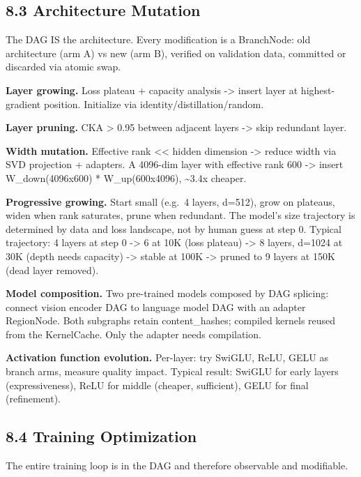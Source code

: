\subsection{8.3 Architecture Mutation}\label{architecture-mutation}

The DAG IS the architecture. Every modification is a BranchNode: old architecture (arm A) vs new (arm B), verified on validation data, committed or discarded via atomic swap.

\textbf{Layer growing.} Loss plateau + capacity analysis -\textgreater{} insert layer at highest-gradient position. Initialize via identity/distillation/random.

\textbf{Layer pruning.} CKA \textgreater{} 0.95 between adjacent layers -\textgreater{} skip redundant layer.

\textbf{Width mutation.} Effective rank \textless\textless{} hidden dimension -\textgreater{} reduce width via SVD projection + adapters. A 4096-dim layer with effective rank 600 -\textgreater{} insert W\_down(4096x600) * W\_up(600x4096), \textasciitilde3.4x cheaper.

\textbf{Progressive growing.} Start small (e.g.~4 layers, d=512), grow on plateaus, widen when rank saturates, prune when redundant. The model's size trajectory is determined by data and loss landscape, not by human guess at step 0. Typical trajectory: 4 layers at step 0 -\textgreater{} 6 at 10K (loss plateau) -\textgreater{} 8 layers, d=1024 at 30K (depth needs capacity) -\textgreater{} stable at 100K -\textgreater{} pruned to 9 layers at 150K (dead layer removed).

\textbf{Model composition.} Two pre-trained models composed by DAG splicing: connect vision encoder DAG to language model DAG with an adapter RegionNode. Both subgraphs retain content\_hashes; compiled kernels reused from the KernelCache. Only the adapter needs compilation.

\textbf{Activation function evolution.} Per-layer: try SwiGLU, ReLU, GELU as branch arms, measure quality impact. Typical result: SwiGLU for early layers (expressiveness), ReLU for middle (cheaper, sufficient), GELU for final (refinement).

\subsection{8.4 Training Optimization}\label{training-optimization}

The entire training loop is in the DAG and therefore observable and modifiable.


